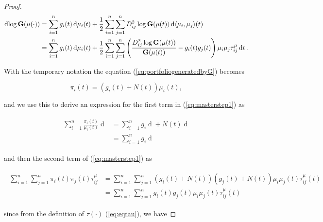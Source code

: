 \documentclass[british]{amsart} \usepackage{lmodern}
\numberwithin{equation}{section} \numberwithin{figure}{section}
\theoremstyle{plain} \newtheorem{thm}{\protect\theoremname}[section]
\theoremstyle{definition} \newtheorem{defn}[thm]{\protect\definitionname}
\theoremstyle{plain} \newtheorem{assumption}[thm]{\protect\assumptionname}
\theoremstyle{plain} \newtheorem{lem}[thm]{\protect\lemmaname}
\theoremstyle{plain} \newtheorem{prop}[thm]{\protect\propositionname}
\theoremstyle{remark} \newtheorem{rem}[thm]{\protect\remarkname}
\theoremstyle{plain} \newtheorem{cor}[thm]{\protect\corollaryname}
\renewcommand{\d}[1]{\mathop{\mathrm{d}{#1}}}
\begin{document}
\begin{proof}
  \begin{gather} 
    \label{eq:x}
    \begin{split} 
      \d{\log{\G{\mu(\cdot)}}} 
        &=  \sum_{i=1}^{n} g_{i}(t) \d{\mu_{i}}(t) +
            \frac{1}{2} \sum_{i=1}^{n} \sum_{j=1}^{n} D_{ij}^2\log{\Gmu} 
            \d{\langle \mu_{i}, \mu_{j} \rangle}(t) \\
        &=  \sum_{i=1}^{n} g_{i}(t) \d{\mu_{i}}(t) +
            \frac{1}{2} \sum_{i=1}^{n} \sum_{j=1}^{n} 
            \left(
              \frac{D_{ij}^2\log{\Gmu}}{\Gmu} - g_{i}(t)g_{j}(t) 
            \right)
            \mu_{i} \mu_{j} \tau_{ij}^{\mu} \d{t}. 
   \end{split} 
  \end{gather}

With the temporary notation the equation (\ref{eq:portfoliogeneratedbyG})
becomes

  \begin{equation}
    \pi_{i}(t) = (g_{i}(t) + N(t))\mu_{i}(t),
  \end{equation} 

and we use this to derive an expression for the first term in
(\ref{eq:masterstep1}) as

  \begin{gather} 
    \label{eq:masterterm1}
    \begin{split} 
        \sum_{i=1}^{n} \frac{\pi_{i}(t)}{\mu_{i}(t)} \d{\mu_{i}(t)} 
        &= \sum_{i=1}^{n} g_{i}\d{\mu_{i}(t)} + N(t)
            \d{ \left( \sum_{i=1}^{n} \mu_{i}(t) \right) } \\
        &= \sum_{i=1}^{n} g_{i}\d{\mu_{i}(t)}
   \end{split} 
  \end{gather}

and then the second term of (\ref{eq:masterstep1}) as

  \begin{gather} 
    \label{eq:masterterm2}
    \begin{split} 
      \sum_{i=1}^{n} \sum_{j=1}^{n} \pi_{i}(t)\pi_{j}(t)\tau_{ij}^{\mu} 
      &=
        \sum_{i=1}^{n} \sum_{j=1}^{n} 
          (g_{i}(t) + N(t))(g_{j}(t) + N(t)) 
         \mu_{i} \mu_{j}(t) \tau_{ij}^{\mu}(t) \\
      &=
        \sum_{i=1}^{n} \sum_{j=1}^{n} 
          g_{i}(t)g_{j}(t)\mu_{i}\mu_{j}(t)\tau_{ij}^{\mu}(t)
   \end{split} 
  \end{gather}

since from the definition of $\tau(\cdot)$ (\ref{eq:eqtau}), we have


\end{proof}
\end{document}
